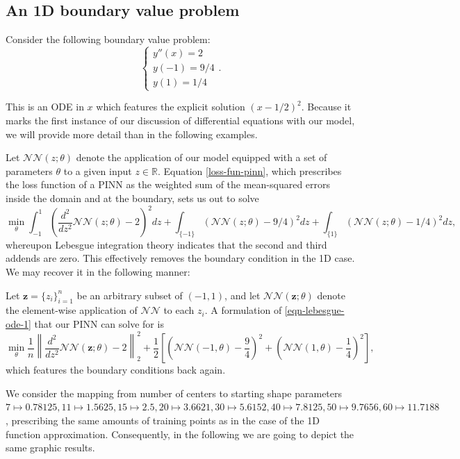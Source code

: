 \documentclass[12pt]{report} %
\newcommand{\tmmathbf}[1]{\ensuremath{\boldsymbol{#1}}}
\begin{document}
\subsection*{An 1D boundary value problem}

Consider the following boundary value problem:
\[ \left\{\begin{array}{l}
    y'' (x) = 2 \\
    y (-1) =9/4 \\
    y (1) = 1 / 4
  \end{array}\right. . \]

This is an ODE in $x$ which features the explicit solution $(x - 1 / 2)^2$.
Because it marks the first instance of our discussion of differential equations
with our model, we will provide more detail than in the following examples.

Let $\mathcal{N}\mathcal{N} (z ; \theta)$ denote the application of our
model equipped with a set of parameters $\theta$ to a given input $z \in
  \mathbb{R}$. Equation \eqref{loss-fun-pinn}, which prescribes the loss function
of a PINN as the weighted sum of the mean-squared errors inside the domain and at
the boundary, sets us out to solve
\begin{equation}
  \min_{\theta}  \int_{-1}^1 \left( \frac{d^2}{d z^2} \mathcal{N}\mathcal{N} (z ;
    \theta) - 2 \right)^2 d z + \int_{\{ -1 \}} (\mathcal{N}\mathcal{N} (z ;
  \theta) - 9 / 4)^2 d z + \int_{\{ 1 \}} (\mathcal{N}\mathcal{N} (z ;
  \theta) - 1 / 4)^2 d z, \label{eqn-lebesgue-ode-1}
\end{equation}
whereupon Lebesgue integration theory indicates that the second and third addends are zero.
This effectively removes the boundary condition in the 1D case. We may
recover it in the following manner:

Let $\tmmathbf{z}= \{ z_i \}_{i = 1}^n$ be an arbitrary subset of $(-1, 1)$,
and let $\mathcal{N}\mathcal{N} (\tmmathbf{z}; \theta)$ denote the
element-wise application of $\mathcal{N}\mathcal{N}$ to each $z_i$. A
formulation of \eqref{eqn-lebesgue-ode-1} that our PINN can solve for is
\[ \min_{\theta}  \frac{1}{n} \left\| \frac{d^2}{d z^2} \mathcal{N}\mathcal{N}
  (\tmmathbf{z}; \theta) - 2 \right\|_2^2
  + \frac{1}{2} \left[ \left(
    \mathcal{N}\mathcal{N} (-1, \theta) - \frac{9}{4} \right)^2 + \left(
    \mathcal{N}\mathcal{N} (1, \theta) - \frac{1}{4} \right)^2 \right], \]
which features the boundary conditions back again. 

We consider the mapping from number of centers to starting shape parameters $7 \mapsto 0.78125, 11 \mapsto 1.5625,
15 \mapsto 2.5, 20 \mapsto 3.6621, 30 \mapsto 5.6152, 40 \mapsto 7.8125,
50 \mapsto 9.7656, 60 \mapsto 11.7188$, prescribing the same amounts of training points as in the case of the 1D function approximation. Consequently, in the following we are going to depict the same graphic results.
\end{document}
